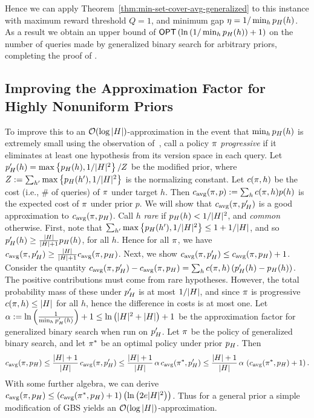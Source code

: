Hence we can apply Theorem~\ref{thm:min-set-cover-avg-generalized} to
this \certifying instance 
with maximum reward threshold $Q =  1$, and 
minimum gap $\eta = 1/\min_{h} p_{H}(h)$.   As a result we obtain an upper bound of 
$\textsf{OPT}  \left( {\ln  \left( {1/\min_{h} p_{H}(h)} \right)  + 1} \right) $ on the number of
queries made by 
generalized binary search for arbitrary priors, completing the proof
of .

\subsection{Improving the Approximation Factor for Highly Nonuniform Priors}
To improve this to an ${\mathcal{O}}(\log |H|)$-approximation in the
event that $\min_{h} p_{H}(h)$ is extremely small 
using the
observation of~\citet{kosaraju99}, call a policy $\pi$
\emph{progressive} if it eliminates at least one hypothesis from its
version space in each query.  Let 
$p_{H}'(h) =  \max\left\{p_{H}(h),
  1/|H|^{2}\right\}/Z$ 
be the modified prior, where $Z := \sum_{h'}  \max\left\{p_{H}(h'),
  1/|H|^{2}\right\}$ is the normalizing constant.
Let $c(\pi, h)$ be the cost (i.e., \# of queries) of $\pi$ under target $h$.  Then 
${c_{\text{avg}}{(\pi, p)}} := \sum_{h} c(\pi,h) p(h)$ is the expected cost of $\pi$
under prior $p$.
We will show that ${c_{\text{avg}}{(\pi, p_{H}')}}$ is a good approximation to
${c_{\text{avg}}{(\pi, p_{H})}}$.
%
Call $h$ \emph{rare} if $p_{H}(h) < 1/|H|^{2}$, and
\emph{common} otherwise.
First, note that $\sum_{h'}  \max\left\{p_{H}(h'), 1/|H|^{2}\right\}
\le 1 + 1/|H|$, and so 
$p_{H}'(h) \ge \frac{|H|}{|H| + 1} p_{H}(h)$,
for all $h$.   Hence for all $\pi$, we have 
${c_{\text{avg}}{(\pi, p_{H}')}} \ge \frac{|H|}{|H| + 1} {c_{\text{avg}}{(\pi, p_{H})}}$.
%
Next, we show ${c_{\text{avg}}{(\pi, p_{H}')}} \le {c_{\text{avg}}{(\ensuremath{\pi}, \ensuremath{p_{H}})}} + 1$.
Consider the quantity ${c_{\text{avg}}{(\pi, p_{H}')}} - {c_{\text{avg}}{(\pi, p_{H})}} =  \sum_{h}
c(\pi,h)  \left( {p_{H}'(h) - p_{H}(h)} \right) $.
The positive contributions must come from rare hypotheses.
However, the total probability mass of these under $p_{H}'$ is at
most $1/|H|$, and since $\pi$ is progressive 
$c(\pi,h) \le |H|$ for all $h$, hence the difference in costs is at most one.
Let $\alpha := \ln  \left( {\frac{1}{\min_{h} p_{H}'(h)}} \right)  + 1 \le
\ln  \left( {|H|^2 + |H|} \right)  + 1$ be the approximation
factor for generalized binary search when run on $p_{H}'$.  
Let $\pi$ be the policy of generalized binary search, and
let $\pi^*$ be an optimal policy under prior $p_{H}$.
Then 
\[
{c_{\text{avg}}{(\pi, p_{H})}} \le \frac{|H|+1}{|H|} \,{c_{\text{avg}}{(\pi,
  p_{H}')}} 
\le \frac{|H|+1}{|H|} \, \alpha \, {c_{\text{avg}}{(\pi^*,
  p_{H}')}} \le  \frac{|H|+1}{|H|} \, \alpha \,  \left( {{c_{\text{avg}}{(\pi^*, p_{H})}} + 1} \right) .
\]
With some further algebra, we can derive ${c_{\text{avg}}{(\pi, p_{H})}}
\le  \left( {{c_{\text{avg}}{(\pi^*, p_{H})}} + 1} \right)   \left( {\ln  \left( { 2e |H|^2} \right) } \right) $.
Thus for a general prior a simple modification of GBS 
yields an ${\mathcal{O}}(\log |H|)$-approximation.



